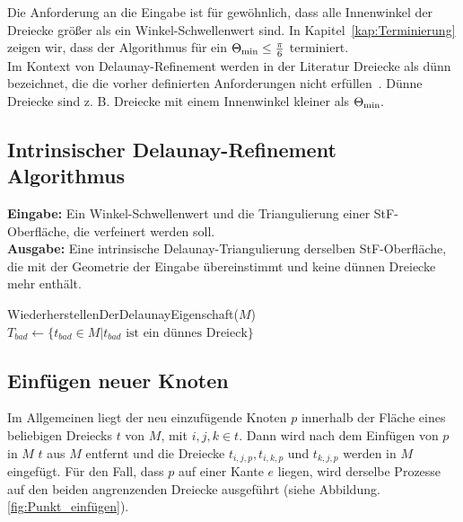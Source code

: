Die Anforderung an die Eingabe ist für gewöhnlich,
dass alle Innenwinkel der Dreiecke größer als ein Winkel-Schwellenwert \kleinsterWinkel sind.
In Kapitel~\ref{kap:Terminierung} zeigen wir, dass der Algorithmus für ein $\kleinsterWinkel* \leq \frac{\pi}{6} $  terminiert.\\
Im Kontext von Delaunay-Refinement werden in der Literatur  Dreiecke als dünn bezeichnet, die die vorher definierten Anforderungen nicht erfüllen~\cite{shewchuk:1997:delaunay}. 
Dünne Dreiecke sind z. B. Dreiecke mit einem Innenwinkel kleiner als $\kleinsterWinkel*.$ 

\newpage

\subsection*{Intrinsischer Delaunay-Refinement Algorithmus}
\textbf{Eingabe:}
Ein Winkel-Schwellenwert \kleinsterWinkel und die Triangulierung einer StF-Oberfläche, die verfeinert werden soll.  \\

\textbf{Ausgabe:}
Eine intrinsische Delaunay-Triangulierung derselben StF-Oberfläche, die mit der Geometrie der Eingabe übereinstimmt und keine dünnen Dreiecke mehr enthält.\\

\begin{algorithm}[H]
\label{alg:1}
\SetAlgoLined
{}
  WiederherstellenDerDelaunayEigenschaft($M$)\;
 $T_{bad} \gets  \{t_{bad} \in M | t_{bad}  \text{ ist ein dünnes Dreieck}\}$ \;
 \caption{\algorithmusname}
\end{algorithm}


\subsection*{Einfügen neuer Knoten}
Im Allgemeinen liegt der neu einzufügende Knoten $p$ innerhalb der Fläche eines beliebigen Dreiecks  $t$  von $M$, mit $i,j,k \in t$. Dann wird nach dem Einfügen von $p$ in $M$ $t$ aus $M$ entfernt und die Dreiecke $t_{i,j,p}, t_{i,k,p}$ und $t_{k,j,p}$ werden  in $M$ eingefügt. 
Für den Fall, dass $p$ auf einer Kante $e$ liegen, wird derselbe Prozesse auf den beiden angrenzenden Dreiecke ausgeführt (siehe Abbildung. \ref{fig:Punkt_einfügen}).  

